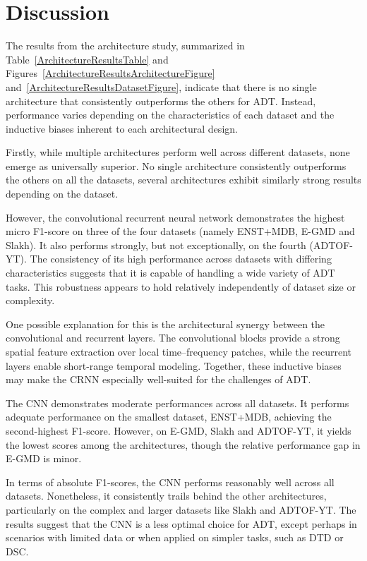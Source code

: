 \section{Discussion}

The results from the architecture study, summarized in Table~\ref{ArchitectureResultsTable} and Figures~\ref{ArchitectureResultsArchitectureFigure} and~\ref{ArchitectureResultsDatasetFigure}, indicate that there is no single architecture that consistently outperforms the others for \gls{ADT}. Instead, performance varies depending on the characteristics of each dataset and the inductive biases inherent to each architectural design.

Firstly, while multiple architectures perform well across different datasets, none emerge as universally superior. No single architecture consistently outperforms the others on all the datasets, several architectures exhibit similarly strong results depending on the dataset. 

However, the convolutional recurrent neural network demonstrates the highest micro F1-score on three of the four datasets (namely ENST+MDB, E-GMD and Slakh). It also performs strongly, but not exceptionally, on the fourth (ADTOF-YT). The consistency of its high performance across datasets with differing characteristics suggests that it is capable of handling a wide variety of \gls{ADT} tasks. This robustness appears to hold relatively independently of dataset size or complexity. 

One possible explanation for this is the architectural synergy between the convolutional and recurrent layers. The convolutional blocks provide a strong spatial feature extraction over local time–frequency patches, while the recurrent layers enable short-range temporal modeling. Together, these inductive biases may make the \gls{CRNN} especially well-suited for the challenges of \gls{ADT}.

The \acrfull{CNN} demonstrates moderate performances across all datasets. It performs adequate performance on the smallest dataset, ENST+MDB, achieving the second-highest F1-score. However, on E-GMD, Slakh and ADTOF-YT, it yields the lowest scores among the architectures, though the relative performance gap in E-GMD is minor. 

In terms of absolute F1-scores, the \gls{CNN} performs reasonably well across all datasets. Nonetheless, it consistently trails behind the other architectures, particularly on the complex and larger datasets like Slakh and ADTOF-YT. The results suggest that the \gls{CNN} is a less optimal choice for \gls{ADT}, except perhaps in scenarios with limited data or when applied on simpler tasks, such as \gls{DTD} or \acrfull{DSC}. 

